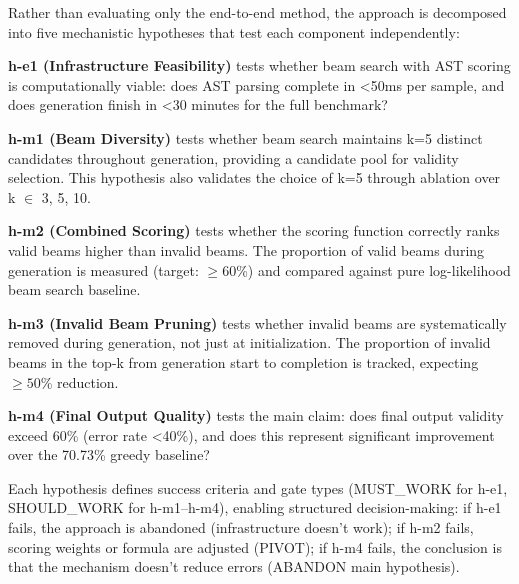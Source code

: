 Rather than evaluating only the end-to-end method, the approach is decomposed into five mechanistic hypotheses that test each component independently:

\textbf{h-e1 (Infrastructure Feasibility)} tests whether beam search with AST scoring is computationally viable: does AST parsing complete in <50ms per sample, and does generation finish in <30 minutes for the full benchmark?

\textbf{h-m1 (Beam Diversity)} tests whether beam search maintains k=5 distinct candidates throughout generation, providing a candidate pool for validity selection. This hypothesis also validates the choice of k=5 through ablation over k $\in$ {3, 5, 10}.

\textbf{h-m2 (Combined Scoring)} tests whether the scoring function correctly ranks valid beams higher than invalid beams. The proportion of valid beams during generation is measured (target: $\geq 60$\%) and compared against pure log-likelihood beam search baseline.

\textbf{h-m3 (Invalid Beam Pruning)} tests whether invalid beams are systematically removed during generation, not just at initialization. The proportion of invalid beams in the top-k from generation start to completion is tracked, expecting $\geq 50$\% reduction.

\textbf{h-m4 (Final Output Quality)} tests the main claim: does final output validity exceed 60\% (error rate <40\%), and does this represent significant improvement over the 70.73\% greedy baseline?

Each hypothesis defines success criteria and gate types (MUST\_WORK for h-e1, SHOULD\_WORK for h-m1--h-m4), enabling structured decision-making: if h-e1 fails, the approach is abandoned (infrastructure doesn't work); if h-m2 fails, scoring weights or formula are adjusted (PIVOT); if h-m4 fails, the conclusion is that the mechanism doesn't reduce errors (ABANDON main hypothesis).

